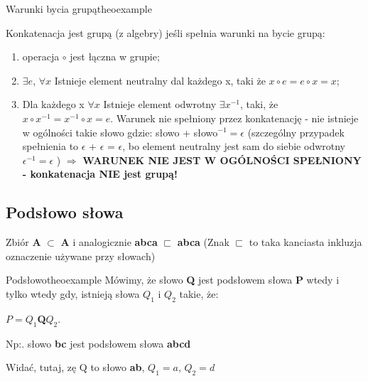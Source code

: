 		\begin{mytheo}{Warunki bycia grupą}{theoexample}

			Konkatenacja jest grupą (z algebry) jeśli spełnia warunki na bycie grupą:

			\begin{enumerate}[label=(\roman*)]
			  \item operacja $\circ$ jest łączna w grupie;
			  
			  \item $\exists e$, $\forall x $ Istnieje element neutralny dal każdego x, 
			  		taki że  $x \circ e = e \circ x = x$;
	
			  \item Dla każdego x $\forall x $   Istnieje element odwrotny  
				 $\exists x^{-1}$, taki, że  $x \circ  x^{-1} = x^{-1} \circ x = e$. 
				 \newline Warunek nie spełniony przez konkatenację - nie istnieje w 
				 ogólności takie słowo gdzie: słowo + słowo$^{-1} = \epsilon$
				 (szczególny przypadek spełnienia to $\epsilon$ + $\epsilon$ = $\epsilon$, 
				 bo element neutralny jest sam do siebie odwrotny $\epsilon^{-1} = \epsilon$ ) 
				 \newline $\Rightarrow$ 
				 {\bf WARUNEK NIE JEST W OGÓLNOŚCI SPEŁNIONY - konkatenacja NIE jest grupą!}
			\end{enumerate}

		\end{mytheo}

	
	
	\subsection{Podsłowo słowa}
		Zbiór { \bf A } $\subset$   { \bf A } i analogicznie  { \bf abca } $\sqsubset$  { \bf abca }
		(Znak $\sqsubset$  to taka kanciasta inkluzja oznaczenie używane przy słowach)
		
		\begin{mytheo}{Podsłowo}{theoexample}
			Mówimy, że słowo {\bf Q} jest podsłowem słowa {\bf P} wtedy i tylko wtedy gdy,
			istnieją słowa $Q_{1}$ i $Q_{2}$ takie, że:
			\begin{center}
			$P = Q_{1}${\bf Q}$Q_{2}$.
			\end{center}
			Np:. słowo {\bf bc} jest podsłowem słowa {\bf abcd} 
			
			\begin{center}
			\end{center}
			
			Widać, tutaj, zę Q to słowo {\bf ab}, $Q_{1} = a$, $Q_{2}=d$
		\end{mytheo}
		
